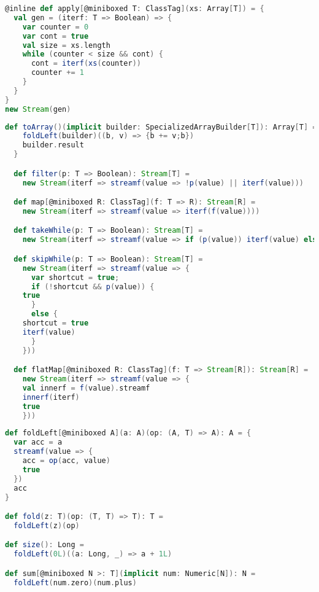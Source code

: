 \begin{lstlisting}[language=scala]
@inline def apply[@miniboxed T: ClassTag](xs: Array[T]) = {
  val gen = (iterf: T => Boolean) => {
    var counter = 0
    var cont = true
    val size = xs.length
    while (counter < size && cont) {
      cont = iterf(xs(counter))
      counter += 1
    }
  }
}
new Stream(gen)
\end{lstlisting}


\begin{lstlisting}[language=scala]
  def toArray()(implicit builder: SpecializedArrayBuilder[T]): Array[T] = {
    foldLeft(builder)((b, v) => {b += v;b})
    builder.result
  }

  def filter(p: T => Boolean): Stream[T] =
    new Stream(iterf => streamf(value => !p(value) || iterf(value)))

  def map[@miniboxed R: ClassTag](f: T => R): Stream[R] = 
    new Stream(iterf => streamf(value => iterf(f(value))))

  def takeWhile(p: T => Boolean): Stream[T] = 
    new Stream(iterf => streamf(value => if (p(value)) iterf(value) else false))

  def skipWhile(p: T => Boolean): Stream[T] = 
    new Stream(iterf => streamf(value => {
      var shortcut = true;
      if (!shortcut && p(value)) {
	true
      }
      else {
	shortcut = true
	iterf(value)
      }
    }))

  def flatMap[@miniboxed R: ClassTag](f: T => Stream[R]): Stream[R] = 
    new Stream(iterf => streamf(value => {
	val innerf = f(value).streamf
	innerf(iterf)
	true
    }))
\end{lstlisting}

\begin{lstlisting}[language=scala]
def foldLeft[@miniboxed A](a: A)(op: (A, T) => A): A = {
  var acc = a
  streamf(value => {
    acc = op(acc, value)
    true
  })
  acc
}

def fold(z: T)(op: (T, T) => T): T = 
  foldLeft(z)(op)

def size(): Long = 
  foldLeft(0L)((a: Long, _) => a + 1L)

def sum[@miniboxed N >: T](implicit num: Numeric[N]): N = 
  foldLeft(num.zero)(num.plus)
\end{lstlisting}

